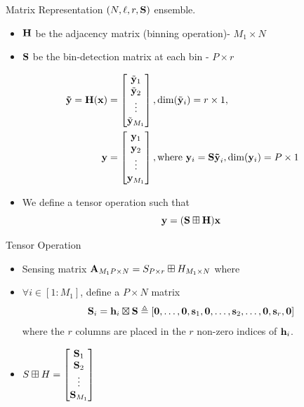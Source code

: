 \documentclass[10pt]{beamer}
\begin{document}
\begin{frame}{Matrix Representation}
$(N,\ell,r,\mathbf{S})$ ensemble. 
\begin{itemize}
\item $\mathbf{H}$ be the adjacency matrix (binning operation)- $M_1 \times N$
\item $\mathbf{S}$ be the bin-detection matrix at each bin - $P \times r$
\end{itemize}
\begin{align*}
\mbf{\tilde{y}=H(x)}&= 
\begin{bmatrix}
   \tilde{\mbf{ y}}_{1} \\
   \tilde{ \mbf{y}}_{2} \\
    \vdots \\
   \tilde{\mbf{y}}_{M_1}
\end{bmatrix}
,\text{dim}(\tilde{\mbf{y}}_{i} )=r \times 1,
\\
\vspace{10pt}
\mbf{y}&= 
\begin{bmatrix}
   \mbf{ y}_{1}\\
    \mbf{y}_{2}  \\
    \vdots \\
    \mbf{y}_{M_1}
\end{bmatrix}
, \text{where } \mbf{y}_i= \mbf{S \tilde{y}}_{i}, \text{dim} (\mbf{y}_i)=P \times 1   
\end{align*}
\begin{itemize}
\item We define a tensor operation such that 
\begin{equation*}
\mathbf{y=(S\boxplus H)  x}
\end{equation*}
\end{itemize}
\end{frame}


\begin{frame}{Tensor Operation}
\begin{itemize}
\item Sensing matrix $\mathbf{A}_{M_{1}P\times N}= S_{P\times r}\boxplus H_{M_{1}\times N}$ where
\vspace{2ex}
\item $\forall i\in [1:M_1]$, define a $P\times N$ matrix
\begin{equation*}
\mathbf{S}_i=\mathbf{h}_i \boxtimes \mathbf{S}\triangleq [\mathbf{0},\ldots,\mathbf{0},\mathbf{s}_1,\mathbf{0},\ldots,\mathbf{s}_2,\ldots,\mathbf{0},\mathbf{s}_r,\mathbf{0}]
\end{equation*}
where the $r$ columns are placed in the $r$ non-zero indices of $\mathbf{h}_i$.
\vspace{2ex}
\item $S\boxplus H=\begin{bmatrix}
\mathbf{S}_1\\
\mathbf{S}_2\\
\vdots\\
\mathbf{S}_{M_1}
\end{bmatrix}
$
\end{itemize}
\end{frame}
\end{document}
